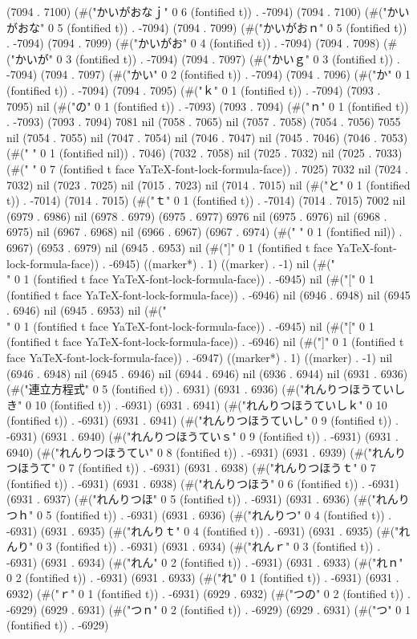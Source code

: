 (7094 . 7100) (#("かいがおなｊ" 0 6 (fontified t)) . -7094) (7094 . 7100) (#("かいがおな" 0 5 (fontified t)) . -7094) (7094 . 7099) (#("かいがおｎ" 0 5 (fontified t)) . -7094) (7094 . 7099) (#("かいがお" 0 4 (fontified t)) . -7094) (7094 . 7098) (#("かいが" 0 3 (fontified t)) . -7094) (7094 . 7097) (#("かいｇ" 0 3 (fontified t)) . -7094) (7094 . 7097) (#("かい" 0 2 (fontified t)) . -7094) (7094 . 7096) (#("か" 0 1 (fontified t)) . -7094) (7094 . 7095) (#("ｋ" 0 1 (fontified t)) . -7094) (7093 . 7095) nil (#("の" 0 1 (fontified t)) . -7093) (7093 . 7094) (#("ｎ" 0 1 (fontified t)) . -7093) (7093 . 7094) 7081 nil (7058 . 7065) nil (7057 . 7058) (7054 . 7056) 7055 nil (7054 . 7055) nil (7047 . 7054) nil (7046 . 7047) nil (7045 . 7046) (7046 . 7053) (#("	" 0 1 (fontified nil)) . 7046) (7032 . 7058) nil (7025 . 7032) nil (7025 . 7033) (#("       " 0 7 (fontified t face YaTeX-font-lock-formula-face)) . 7025) 7032 nil (7024 . 7032) nil (7023 . 7025) nil (7015 . 7023) nil (7014 . 7015) nil (#("と" 0 1 (fontified t)) . -7014) (7014 . 7015) (#("ｔ" 0 1 (fontified t)) . -7014) (7014 . 7015) 7002 nil (6979 . 6986) nil (6978 . 6979) (6975 . 6977) 6976 nil (6975 . 6976) nil (6968 . 6975) nil (6967 . 6968) nil (6966 . 6967) (6967 . 6974) (#("	" 0 1 (fontified nil)) . 6967) (6953 . 6979) nil (6945 . 6953) nil (#("]" 0 1 (fontified t face YaTeX-font-lock-formula-face)) . -6945) ((marker*) . 1) ((marker) . -1) nil (#("\\" 0 1 (fontified t face YaTeX-font-lock-formula-face)) . -6945) nil (#("[" 0 1 (fontified t face YaTeX-font-lock-formula-face)) . -6946) nil (6946 . 6948) nil (6945 . 6946) nil (6945 . 6953) nil (#("\\" 0 1 (fontified t face YaTeX-font-lock-formula-face)) . -6945) nil (#("[" 0 1 (fontified t face YaTeX-font-lock-formula-face)) . -6946) nil (#("]" 0 1 (fontified t face YaTeX-font-lock-formula-face)) . -6947) ((marker*) . 1) ((marker) . -1) nil (6946 . 6948) nil (6945 . 6946) nil (6944 . 6946) nil (6936 . 6944) nil (6931 . 6936) (#("連立方程式" 0 5 (fontified t)) . 6931) (6931 . 6936) (#("れんりつほうていしき" 0 10 (fontified t)) . -6931) (6931 . 6941) (#("れんりつほうていしｋ" 0 10 (fontified t)) . -6931) (6931 . 6941) (#("れんりつほうていし" 0 9 (fontified t)) . -6931) (6931 . 6940) (#("れんりつほうていｓ" 0 9 (fontified t)) . -6931) (6931 . 6940) (#("れんりつほうてい" 0 8 (fontified t)) . -6931) (6931 . 6939) (#("れんりつほうて" 0 7 (fontified t)) . -6931) (6931 . 6938) (#("れんりつほうｔ" 0 7 (fontified t)) . -6931) (6931 . 6938) (#("れんりつほう" 0 6 (fontified t)) . -6931) (6931 . 6937) (#("れんりつほ" 0 5 (fontified t)) . -6931) (6931 . 6936) (#("れんりつｈ" 0 5 (fontified t)) . -6931) (6931 . 6936) (#("れんりつ" 0 4 (fontified t)) . -6931) (6931 . 6935) (#("れんりｔ" 0 4 (fontified t)) . -6931) (6931 . 6935) (#("れんり" 0 3 (fontified t)) . -6931) (6931 . 6934) (#("れんｒ" 0 3 (fontified t)) . -6931) (6931 . 6934) (#("れん" 0 2 (fontified t)) . -6931) (6931 . 6933) (#("れｎ" 0 2 (fontified t)) . -6931) (6931 . 6933) (#("れ" 0 1 (fontified t)) . -6931) (6931 . 6932) (#("ｒ" 0 1 (fontified t)) . -6931) (6929 . 6932) (#("つの" 0 2 (fontified t)) . -6929) (6929 . 6931) (#("つｎ" 0 2 (fontified t)) . -6929) (6929 . 6931) (#("つ" 0 1 (fontified t)) . -6929) 